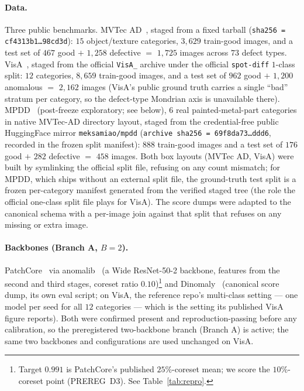 \documentclass[11pt]{article}
\begin{document}
\paragraph{Data.} Three public benchmarks. MVTec AD~\citep{bergmann2019mvtec}, staged from a fixed
tarball (\texttt{sha256\,=\,cf4313b1\allowbreak\ldots98cd3d}): $15$ object/texture categories, $3{,}629$
train-good images, and a test set of $467$ good $+$ $1{,}258$ defective $=$ $1{,}725$ images
across $73$ defect types. VisA~\citep{zou2022spot}, staged from the official
\texttt{VisA\_} archive under the official \texttt{spot-diff} $1$-class split:
$12$ categories, $8{,}659$ train-good images, and a test set of $962$ good
$+$ $1{,}200$ anomalous $=$ $2{,}162$ images (VisA's public ground truth carries a single
``bad'' stratum per category, so the defect-type Mondrian axis is unavailable there). MPDD~\citep{jezek2021mpdd}
(post-freeze exploratory; see below), $6$ real painted-metal-part categories in native MVTec-AD
directory layout, staged from the credential-free public HuggingFace mirror \texttt{meksamiao/mpdd}
(\texttt{archive\ sha256\,=\,69f8da73\allowbreak\ldots ddd6}, recorded in the frozen split manifest):
$888$ train-good images and a test set of $176$ good $+$ $282$ defective $=$ $458$ images. Both box
layouts (MVTec AD, VisA) were built by symlinking the official split file,
refusing on any count mismatch; for MPDD, which ships without an external split file, the ground-truth
test split is a frozen per-category manifest generated from the verified staged tree (the role
the official one-class split file plays for VisA). The score dumps were adapted to the canonical schema with a
per-image join against that split that refuses on any missing or extra image.
\paragraph{Backbones (Branch A, $B=2$).} PatchCore~\citep{roth2022patchcore} via
anomalib~\citep{akcay2022anomalib} (a Wide ResNet-50-2 backbone, features from the second and
third stages, coreset ratio $0.10$)\footnote{Target $0.991$ is PatchCore's published
$25\%$-coreset mean; we score the $10\%$-coreset point (PREREG~D3).
See Table~\ref{tab:repro}.} and Dinomaly~\citep{guo2025dinomaly} (canonical score dump,
its own eval script; on VisA, the reference repo's multi-class setting --- one model per seed for
all $12$ categories --- which is the setting its published VisA figure reports). Both were
confirmed present and reproduction-passing before any calibration, so the preregistered
two-backbone branch (Branch A) is active; the same two backbones and configurations are used
unchanged on VisA.
\end{document}
